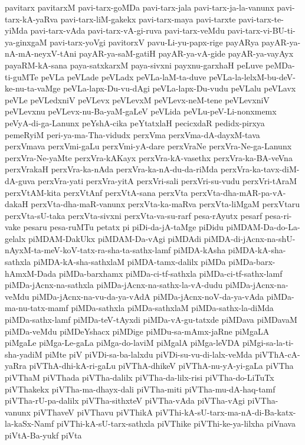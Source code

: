 {pavitarx
pavitarxM
pavi-tarx-goMDa
pavi-tarx-jala
pavi-tarx-ja-la-vanunx
pavi-tarx-kA-yaRva
pavi-tarx-liM-gakekx
pavi-tarx-maya
pavi-tarxte
pavi-tarx-te-yiMda
pavi-tarx-vAda
pavi-tarx-vA-gi-ruva
pavi-tarx-veMdu
pavi-tarx-vi-BU-ti-ya-ginxgaM
pavi-tarx-yoVgi
pavitorxV
pavu-Li-yu-papx-rige
payARya
payAR-ya-nA-mA-neyxV-tAni
payAR-ya-saM-gatiH
payAR-ya-vA-gide
payAR-ya-vayAyx
payaRM-kA-sana
paya-satxkarxM
paya-sivxni
payxnu-garxhaH
peLuve
peMDa-ti-guMTe
peVLa
peVLade
peVLadx
peVLa-laM-ta-duve
peVLa-la-lelxM-bu-deV-ke-nu-ta-vaMge
peVLa-lapx-Du-vu-dAgi
peVLa-lapx-Du-vudu
peVLalu
peVLavx
peVLe
peVLedxniV
peVLevx
peVLevxM
peVLevx-neM-tene
peVLevxniV
peVLevxnu
peVLevx-nu-Ba-yaM-gaLeV
peVLida
peVLu-peV-Li-nonxmemx
peVyA-di-ga-Lanunx
peYshA-cika
peYtatxlaH
pecicxdaR
pedidx-pirxya
pemeRyiM
peri-ya-ma-Tha-vidudx
perxVma
perxVma-dA-dayxM-tava
perxVmava
perxVmi-gaLu
perxVmi-yA-dare
perxVraNe
perxVra-Ne-ga-Lanunx
perxVra-Ne-yaMte
perxVra-kAKayx
perxVra-kA-vasethx
perxVra-ka-BA-veVna
perxVrakaH
perxVra-ka-nAda
perxVra-ka-nA-du-da-riMda
perxVra-ka-tavx-diM-dA-guva
perxVra-yati
perxVra-yitA
perxVri-sali
perxVri-su-vudu
perxVri-tAraM
perxVtAM-kita
perxVtAnf
perxVtA-sana
perxVta
perxVta-dha-mAR-pa-vA-dakaH
perxVta-dha-maR-vanunx
perxVta-ka-maRva
perxVta-liMgaM
perxVtaru
perxVta-sU-taka
perxVta-sivxni
perxVta-va-su-rarf
pesa-rAyutx
pesarf
pesa-ri-vake
pesaru
pesa-ruMTu
petatx
pi
piDi-da-jA-taMge
piDidu
piMDAM-Da-do-La-gelalx
piMDAM-DakUkx
piMDAM-Da-vAgi
piMDAdi
piMDA-di-jAcnx-na-shU-nAyxM-ta-meV-koV-tatx-ra-sha-ta-sathx-lamf
piMDA-kAsha
piMDA-kA-sha-sathxla
piMDA-kA-sha-sathxlaM
piMDA-tamx-dalilx
piMDa
piMDa-barx-hAmxM-Dada
piMDa-barxhamx
piMDa-ci-tf-sathxla
piMDa-ci-tf-sathx-lamf
piMDa-jAcnx-na-sathxla
piMDa-jAcnx-na-sathx-la-vA-dudu
piMDa-jAcnx-na-veMdu
piMDa-jAcnx-na-vu-da-ya-vAdA
piMDa-jAcnx-noV-da-ya-vAda
piMDa-ma-nu-tatx-mamf
piMDa-sathxla
piMDa-sathxlaM
piMDa-sathx-la-diMda
piMDa-sathx-lamf
piMDa-teV-tAyxdi
piMDa-vA-gu-tatxde
piMDava
piMDavaM
piMDa-veMdu
piMDeYshacx
piMDige
piMDu-sa-mAmx-jaRne
piMgaLA
piMgaLe
piMga-Le-gaLa
piMga-do-laviM
piMgalA
piMga-leVDA
piMgi-sa-la-ti-sha-yadiM
piMte
piV
piVDi-sa-ba-lalxdu
piVDi-su-vu-di-lalx-veMda
piVThA-cA-yaRra
piVThA-dhi-kA-ri-gaLu
piVThA-dhikeV
piVThA-nu-yA-yi-gaLa
piVTha
piVThaM
piVThada
piVTha-dalilx
piVTha-da-lilx-risi
piVTha-do-LiTuTx
piVThakekx
piVTha-ma-dhayx-dali
piVTha-miti
piVTha-mu-dA-haq-tamf
piVTha-rU-pa-dalilx
piVTha-sithxteV
piVTha-vAda
piVTha-vAgi
piVTha-vanunx
piVThaveV
piVThavu
piVThikA
piVThi-kA-sU-tarx-ma-nA-di-Ba-katx-la-kaSx-Namf
piVThi-kA-sU-tarx-sathxla
piVThike
piVThi-ke-ya-lilxha
piVnava
piVtA-Ba-yukf
piVta
}
